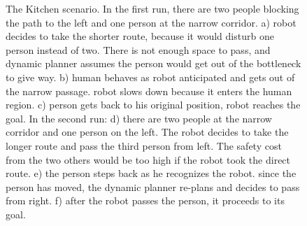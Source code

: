 \documentclass[12pt]{gatech-thesis}
\begin{document}
\begin{figure}[ht!]
{        }%
        
    \caption{%
	The Kitchen scenario. In the first run, there are two people blocking the path to the left and one person at the narrow corridor. a) robot decides to take the shorter route, because it would disturb one person instead of two. There is not enough space to pass, and dynamic planner assumes the person would get out of the bottleneck to give way. b) human behaves as robot anticipated and gets out of the narrow passage. robot slows down because it enters the human region. c) person gets back to his original position, robot reaches the goal. In the second run: d) there are two people at the narrow corridor and one person on the left. The robot decides to take the longer route and pass the third person from left. The safety cost from the two others would be too high if the robot took the direct route. e) the person steps back as he recognizes the robot. since the person has moved, the dynamic planner re-plans and decides to pass from right. f) after the robot passes the person, it proceeds to its goal.
     }%
   \label{fig:kitchen}
   \vspace{-0.3cm}
\end{figure}
\end{document}
